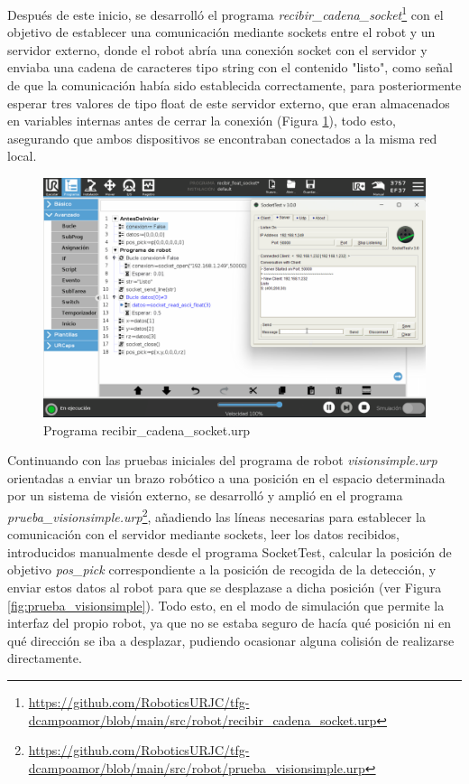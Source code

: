 Después de este inicio, se desarrolló el programa \textit{recibir\_cadena\_socket}\footnote{\url{https://github.com/RoboticsURJC/tfg-dcampoamor/blob/main/src/robot/recibir_cadena_socket.urp}} con el objetivo de establecer una comunicación mediante sockets entre el robot y un servidor externo, donde el robot abría una conexión socket con el servidor y enviaba una cadena de caracteres tipo string con el contenido "listo", como señal de que la comunicación había sido establecida correctamente, para posteriormente esperar tres valores de tipo float de este servidor externo, que eran almacenados en variables internas antes de cerrar la conexión (Figura \ref{fig:recibir_cadena_socket}), todo esto, asegurando que ambos dispositivos se encontraban conectados a la misma red local.

   \begin{figure}[H]
     \centering
     \begin{center}
       \includegraphics[width=155mm]{figs/recibir_cadena_socket.png}
     \end{center}
     \caption{Programa recibir\_cadena\_socket.urp}
     \label{fig:recibir_cadena_socket}
  \end{figure}

Continuando con las pruebas iniciales del programa de robot \textit{visionsimple.urp} orientadas a enviar un brazo robótico a una posición en el espacio determinada por un sistema de visión externo, se desarrolló y amplió en el programa \textit{prueba\_visionsimple.urp}\footnote{\url{https://github.com/RoboticsURJC/tfg-dcampoamor/blob/main/src/robot/prueba_visionsimple.urp}}, añadiendo las líneas necesarias para establecer la comunicación con el servidor mediante sockets, leer los datos recibidos, introducidos manualmente desde el programa SocketTest, calcular la posición de objetivo \textit{pos\_pick} correspondiente a la posición de recogida de la detección, y enviar estos datos al robot para que se desplazase a dicha posición (ver Figura \ref{fig:prueba_visionsimple}). Todo esto, en el modo de simulación que permite la interfaz del propio robot, ya que no se estaba seguro de hacía qué posición ni en qué dirección se iba a desplazar, pudiendo ocasionar alguna colisión de realizarse directamente. 

